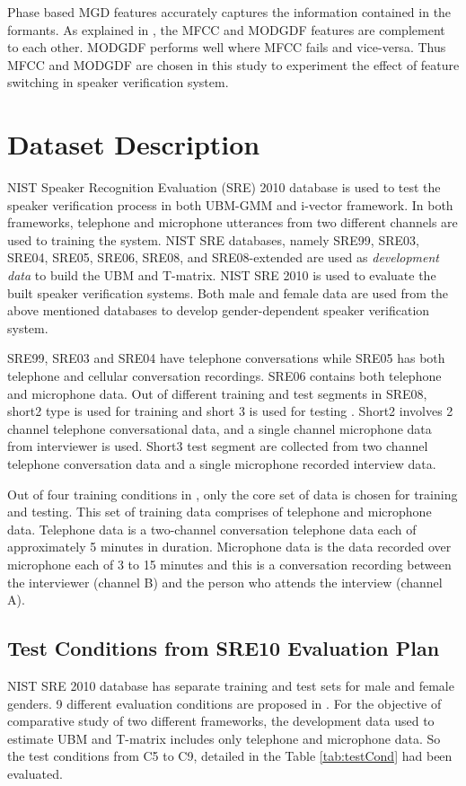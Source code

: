 \documentclass{article}
\begin{document}
\vspace{0.25cm}
Phase based MGD features accurately captures the information contained in the formants.  As explained in  \cite{mgd_complement}, the MFCC and MODGDF features are complement to each other. MODGDF performs well where MFCC fails and vice-versa. Thus MFCC and MODGDF are chosen in this study to experiment the effect of feature switching in speaker verification system.

\section{Dataset Description}
\label{sec:dB}
NIST Speaker Recognition Evaluation (SRE) 2010 database is used to test the speaker verification process in both UBM-GMM and i-vector framework. In both frameworks, telephone and microphone utterances from two different channels are used to training  the system. NIST SRE databases, namely  SRE99, SRE03, SRE04, SRE05, SRE06, SRE08, and SRE08-extended are used as {\it { development data}} to build the UBM and T-matrix. NIST SRE 2010 is used to evaluate the built speaker verification systems. Both male and female data are used from the above mentioned databases to develop gender-dependent speaker verification system.

\vspace{0.25cm}
SRE99, SRE03 and SRE04 have telephone conversations while SRE05 has both telephone and cellular conversation recordings. SRE06 contains both telephone and microphone data. Out of different training  and test segments in SRE08, short2 type is used for training and short 3 is used for testing  \cite{sre2008}. Short2 involves 2 channel telephone conversational data, and a single channel microphone data from interviewer is used. Short3 test segment are collected from two channel telephone conversation data and a single microphone recorded interview data. 

\vspace{0.25cm}
Out of four training  conditions in  \cite{sre2010}, only the core set of data is chosen for training and testing. This set of training data comprises of telephone and microphone data. Telephone data is a two-channel conversation telephone data each of approximately 5 minutes in duration.  Microphone data is the data recorded over microphone each of 3 to 15 minutes and this is a conversation recording between the interviewer (channel B) and the person who attends the interview (channel A).  


\subsection{ \small \bf Test Conditions from SRE10 Evaluation Plan}
\label{subsec:test_conditions}
NIST SRE 2010 database has separate training  and test sets for male and female genders. 9 different evaluation conditions are proposed in  \cite{sre2010}. For the objective of comparative study of two different frameworks, the development data used to estimate UBM and T-matrix includes only telephone and microphone data. So the test conditions from C5 to C9, detailed in the Table \ref{tab:testCond} had been evaluated.
\end{document}
